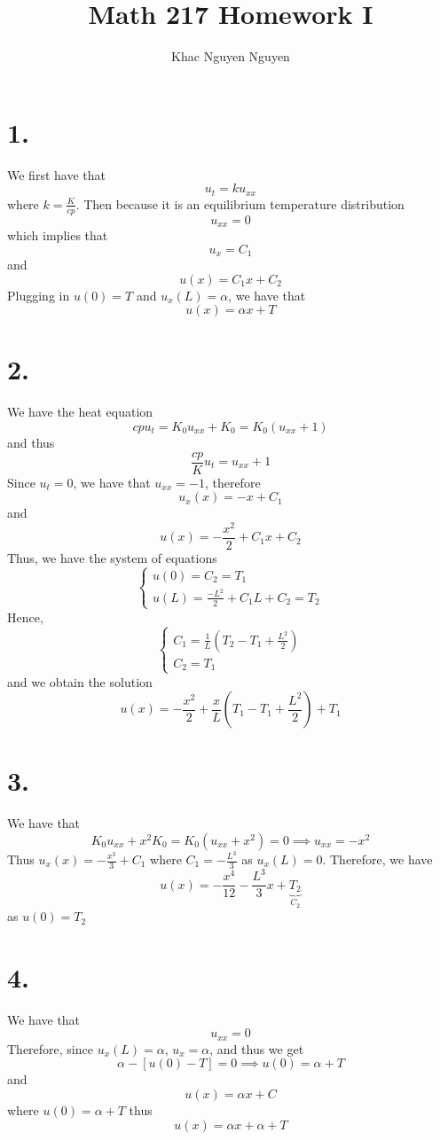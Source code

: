 \documentclass[11pt]{article}
\title{\textbf{Math 217 Homework I}}
\author{Khac Nguyen Nguyen}
\date{}
\theoremstyle{mystyle}
\theoremstyle{definition}
\begin{document}
\section*{1.}
We first have that 
\[
  u_t = ku_{xx}
\]
where $k = \frac{K}{cp}$. Then because it is an equilibrium temperature distribution 
\[
  u_{xx} = 0
\]
which implies that 
\[
  u_x = C_1
\]
and 
\[
  u(x) = C_1 x + C_2
\]
Plugging in $u(0) = T$ and $u_x(L) = \alpha$, we have that 
\[
  u(x) = \alpha x + T
\]
\newpage
\section*{2.}
We have the heat equation 
\[
  cpu_t = K_0 u_{xx} + K_0 = K_0 (u_{xx} + 1)
\]
and thus 
\[
  \frac{cp}{K}u_t = u_{xx} + 1
\]
Since $u_t = 0$, we have that $u_{xx} = -1$, therefore 
\[
  u_{x}(x) = -x + C_1
\]
and 
\[
  u(x) = -\displaystyle\frac{x^2}{2} + C_1 x + C_2
\]
Thus, we have the system of equations
\[
  \begin{cases}
    u(0) = C_2 = T_1 \\
    u(L) = \displaystyle\frac{-L^2}{2} + C_1 L + C_2 = T_2
  \end{cases}
\]
Hence, 
\[
  \begin{cases}
    C_1 = \displaystyle\frac{1}{L}\left(T_2 - T_1 + \displaystyle\frac{L^2}{2} \right)\\
    C_2 = T_1
  \end{cases}
\]
and we obtain the solution 
\[
  u(x) = -\displaystyle\frac{x^2}{2} + \displaystyle\frac{x}{L}\left(T_1 - T_1 + \displaystyle\frac{L^2}{2} \right) + T_1
\]
\newpage
\section*{3.}
We have that 
\[
  K_0 u_{xx} + x^2 K_0 = K_0(u_{xx} + x^2) = 0 \implies u_{xx} = -x^2
\]
Thus $u_{x}(x) = -\displaystyle\frac{x^3}{3} + C_1$ where $C_1 = -\displaystyle\frac{L^3}{3}$ as $u_x(L) = 0$. Therefore, we have 
\[
  u(x) = -\displaystyle\frac{x^4}{12}  - \displaystyle\frac{L^3}{3}x + \underbrace{T_2}_{C_2}
\]
as $u(0) = T_2$
\newpage
\section*{4.}
We have that 
\[
  u_{xx} = 0
\]
Therefore, since $u_x(L) = \alpha$, $u_x = \alpha$, and thus we get 
\[
  \alpha - [u(0)-T] = 0 \implies u(0) = \alpha + T
\]
and 
\[
  u(x) = \alpha x + C 
\]
where $u(0) = \alpha + T$ thus 
\[
  u(x) = \alpha x + \alpha + T
\]
\newpage
\end{document}
